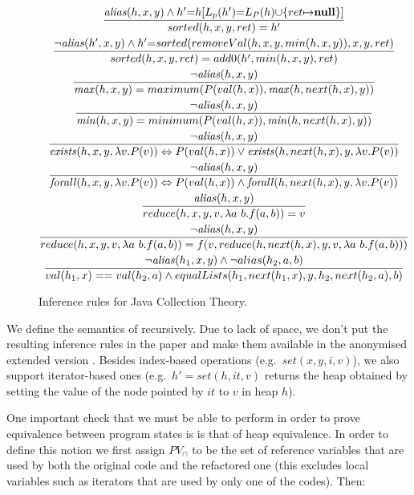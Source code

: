 \documentclass[runningheads,a4paper]{llncs}
\begin{document}
\begin{figure*}\ContinuedFloat
\begin{framed}
\begin{gather}
\frac{\mathit{alias}(h,x, y)\wedge h'{=}h[L_p(h') {=} L_P(h) {\cup} \{ret{\mapsto}
\mathbf{null}\}]}{sorted(h,x,y,ret) = h'}\\
\frac{\neg \mathit{alias}(h',x, y) \wedge
h'{=}sorted(removeVal(h,x,y,min(h,x,y)),x,y,ret)}{sorted(h,x,y,ret) = 
add0(h',min(h,x,y),ret)}\\
\frac{\neg \mathit{alias}(h,x, y)}{\mathit{max}(h,x,y) =  maximum(P(val(h,x)),
\mathit{max}(h,next(h,x),y))}\\
\frac{\neg \mathit{alias}(h,x, y)}{\mathit{min}(h,x,y) =  minimum(P(val(h,x)),
\mathit{min}(h,next(h,x),y))}\\
\frac{\neg \mathit{alias}(h,x, y)}{\mathit{exists}(h,x,y,\lambda v. P(v)) \Leftrightarrow 
P(val(h,x)) \vee \mathit{exists}(h,next(h,x),y,\lambda v. P(v))}\\
\frac{\neg \mathit{alias}(h,x, y)}{\mathit{forall}(h,x,y,\lambda v. P(v)) \Leftrightarrow  P(val(h,x))
\wedge \mathit{forall}(h,next(h,x),y,\lambda v. P(v))}\\
\frac{\mathit{alias}(h,x, y)}{reduce(h,x,y,v,\lambda a ~b. f(a,b)) = v}\\
\frac{\neg \mathit{alias}(h,x, y)}{reduce(h,x,y,v,\lambda a ~b. f(a,b)) =  f(v,
reduce(h,next(h,x),y,v,\lambda a ~b. f(a,b)))}\\
\frac{\neg \mathit{alias}(h_1,x, y) \wedge \neg alias(h_2,a,b)}{val(h_1,x) ==
val(h_2,a) \wedge equalLists(h_1,next(h_1,x), y, h_2,next(h_2,a), b)}
\end{gather}
\end{framed}
\caption[]{Inference rules for Java Collection Theory.}
\label{fig:JCT-formal}
\end{figure*}

\else

We define the semantics of \logic recursively.  Due to lack of space, we
don't put the resulting inference rules in the paper and make them
available in the anonymised extended version \cite{extversion}.
%
Besides index-based operations (e.g.~$set(x,y,i,v)$), we also support
iterator-based ones (e.g.~$h' {=} set(h,it,v)$ returns the heap obtained by
setting the value of the node pointed by $it$ to $v$ in heap $h$).

\fi


One important check that we must be able to perform in order to
prove equivalence between program states is
is that of heap equivalence.
In order to define this notion %
we first assign $PV_{\cap}$ to be the set of reference variables that are used by
both the original code and the refactored one (this excludes local variables
such as iterators that are used by only one of the codes).  Then:
\end{document}
